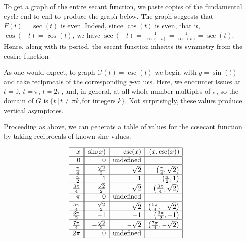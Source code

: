\documentclass{ximera}
\begin{document}
\begin{center}
\end{center}

To get a graph of the entire secant function, we paste copies of the fundamental cycle end to end to produce the graph below.  The graph suggests that $F(t) =\sec(t)$ is even. Indeed, since $\cos(t)$ is even, that is, $\cos(-t) = \cos(t)$, we have $\sec(-t) = \frac{1}{\cos(-t)} = \frac{1}{\cos(t)} = \sec(t)$.  Hence, along with its period,  the secant function inherits its symmetry from the cosine function.

\begin{center}
\end{center}



As one would expect, to graph $G(t) = \csc(t)$ we begin with $y = \sin(t)$ and take reciprocals of the corresponding $y$-values.  Here, we encounter issues at $t = 0$, $t = \pi$, $t = 2\pi$, and, in general, at all whole number multiples of $\pi$, so the domain of $G$ is $\{ t \, | \, t \neq  \pi k, \text{for integers $k$} \}$.  Not surprisingly, these values produce vertical asymptotes.  



Proceeding as above,  we can generate a table of values for the cosecant function by taking reciprocals of known sine values.

\[ \begin{array}{|r||r|r|r|}  \hline
x & \sin(x) & \csc(x) & (x,\csc(x)) \\ \hline
0  & 0 & \text{undefined} &  \\ \hline
\frac{\pi}{4}  & \frac{\sqrt{2}}{2} & \sqrt{2} & \left(\frac{\pi}{4}, \sqrt{2} \right) \\ \hline 
\frac{\pi}{2}  & 1 & 1 & \left(\frac{\pi}{2}, 1 \right) \\ \hline 
\frac{3\pi}{4}  & \frac{\sqrt{2}}{2} & \sqrt{2} & \left(\frac{3\pi}{4}, \sqrt{2} \right) \\  \hline 
\pi & 0 & \text{undefined} &   \\  \hline 
\frac{5\pi}{4}  & -\frac{\sqrt{2}}{2} & -\sqrt{2} & \left(\frac{5\pi}{4}, -\sqrt{2} \right) \\  \hline 
\frac{3\pi}{2}  & -1 & -1 & \left(\frac{3\pi}{2},-1 \right)\\ \hline 
\frac{7\pi}{4}  & -\frac{\sqrt{2}}{2} & -\sqrt{2} & \left(\frac{7\pi}{4}, -\sqrt{2} \right) \\ \hline 
2\pi  & 0 & \text{undefined} &  \\ \hline
\end{array} \] 
\end{document}
